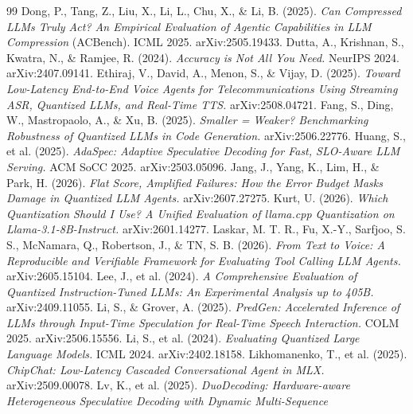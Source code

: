 \documentclass[11pt]{article}
\begin{document}
\begin{thebibliography}{99}
\small
{} Dong, P., Tang, Z., Liu, X., Li, L., Chu, X.,
\& Li, B. (2025). \emph{Can Compressed LLMs Truly Act? An Empirical Evaluation of
Agentic Capabilities in LLM Compression} (ACBench). ICML 2025. arXiv:2505.19433.
 Dutta, A., Krishnan, S., Kwatra, N., \&
Ramjee, R. (2024). \emph{Accuracy is Not All You Need.} NeurIPS 2024. arXiv:2407.09141.
 Ethiraj, V., David, A., Menon, S., \&
Vijay, D. (2025). \emph{Toward Low-Latency End-to-End Voice Agents for
Telecommunications Using Streaming ASR, Quantized LLMs, and Real-Time TTS.}
arXiv:2508.04721.
 Fang, S., Ding, W., Mastropaolo, A., \& Xu, B.
(2025). \emph{Smaller = Weaker? Benchmarking Robustness of Quantized LLMs in Code
Generation.} arXiv:2506.22776.
 Huang, S., et al. (2025). \emph{AdaSpec:
Adaptive Speculative Decoding for Fast, SLO-Aware LLM Serving.} ACM SoCC 2025.
arXiv:2503.05096.
 Jang, J., Yang, K., Lim, H., \& Park, H. (2026).
\emph{Flat Score, Amplified Failures: How the Error Budget Masks Damage in Quantized
LLM Agents.} arXiv:2607.27275.
 Kurt, U. (2026). \emph{Which Quantization Should I Use?
A Unified Evaluation of llama.cpp Quantization on Llama-3.1-8B-Instruct.}
arXiv:2601.14277.
 Laskar, M. T. R., Fu, X.-Y., Sarfjoo, S. S.,
McNamara, Q., Robertson, J., \& TN, S. B. (2026). \emph{From Text to Voice: A
Reproducible and Verifiable Framework for Evaluating Tool Calling LLM Agents.}
arXiv:2605.15104.
 Lee, J., et al. (2024). \emph{A Comprehensive
Evaluation of Quantized Instruction-Tuned LLMs: An Experimental Analysis up to 405B.}
arXiv:2409.11055.
 Li, S., \& Grover, A. (2025).
\emph{PredGen: Accelerated Inference of LLMs through Input-Time Speculation for
Real-Time Speech Interaction.} COLM 2025. arXiv:2506.15556.
 Li, S., et al. (2024). \emph{Evaluating Quantized
Large Language Models.} ICML 2024. arXiv:2402.18158.
 Likhomanenko, T., et al. (2025).
\emph{ChipChat: Low-Latency Cascaded Conversational Agent in MLX.} arXiv:2509.00078.
 Lv, K., et al. (2025). \emph{DuoDecoding:
Hardware-aware Heterogeneous Speculative Decoding with Dynamic Multi-Sequence
}
\end{thebibliography}
\end{document}
